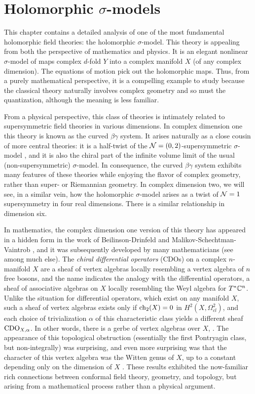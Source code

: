 \documentclass[10pt]{amsart}
\begin{document}
\section{Holomorphic $\sigma$-models}

This chapter contains a detailed analysis of one of the most fundamental holomorphic field theories: the holomorphic $\sigma$-model.
This theory is appealing from both the perspective of mathematics and physics.
It is an elegant nonlinear $\sigma$-model of maps complex $d$-fold $Y$ into a complex manifold $X$ (of any complex dimension). The equations of motion pick out the holomorphic maps. 
Thus, from a purely mathematical perspective, it is a compelling example to study 
because the classical theory naturally involves complex geometry and so must the quantization, although the meaning is less familiar. 

From a physical perspective, this class of theories is intimately related to supersymmetric field theories in various dimensions.
In complex dimension one this theory is known as the curved $\beta\gamma$ system.
It arises naturally as a close cousin of more central theories: it is a half-twist of the $\mathcal N = (0,2)$-supersymmetric $\sigma$-model \cite{WittenCDO}, and it is also the chiral part of the infinite volume limit of the usual (non-supersymmetric) $\sigma$-model. 
In consequence, the curved $\beta\gamma$ system exhibits many features of these theories while enjoying the flavor of complex geometry, rather than super- or Riemannian geometry.
In complex dimension two, we will see, in a similar vein, how the holomorphic $\sigma$-model arises as a twist of $\mathcal N = 1$ supersymmetry in four real dimensions. 
There is a similar relationship in dimension six.

In mathematics, the complex dimension one version of this theory has appeared in a hidden form in the work of Beilinson-Drinfeld and Malikov-Schechtman-Vaintrob \cite{BD,MSV}, and it was subsequently developed by many mathematicians (see \cite{KV,Cheung,Bressler} among much else). The {\em chiral differential operators} (CDOs) on a complex $n$-manifold $X$ are a sheaf of vertex algebras locally resembling a vertex algebra of $n$ free bosons, and the name indicates the analogy with the differential operators, a sheaf of associative algebras on $X$ locally resembling the Weyl algebra for $T^*\mathbb C^n$. Unlike the situation for differential operators, which exist on any manifold $X$, such a sheaf of vertex algebras exists only if ${\rm ch}_2(X) = 0$ in $H^2(X, \Omega^2_{cl})$, and each choice of trivialization $\alpha$ of this characteristic class yields a different sheaf ${\rm CDO}_{X,\alpha}$. In other words, there is a gerbe of vertex algebras over $X$, \cite{GMS}. The appearance of this topological obstruction (essentially the first Pontryagin class, but non-integrally) was surprising, and even more surprising was that the character of this vertex algebra was the Witten genus of $X$, up to a constant depending only on the dimension of $X$ \cite{BorLib}. These results exhibited the now-familiar rich connections between conformal field theory, geometry, and topology, but arising from a mathematical process rather than a physical argument. 
\end{document}
